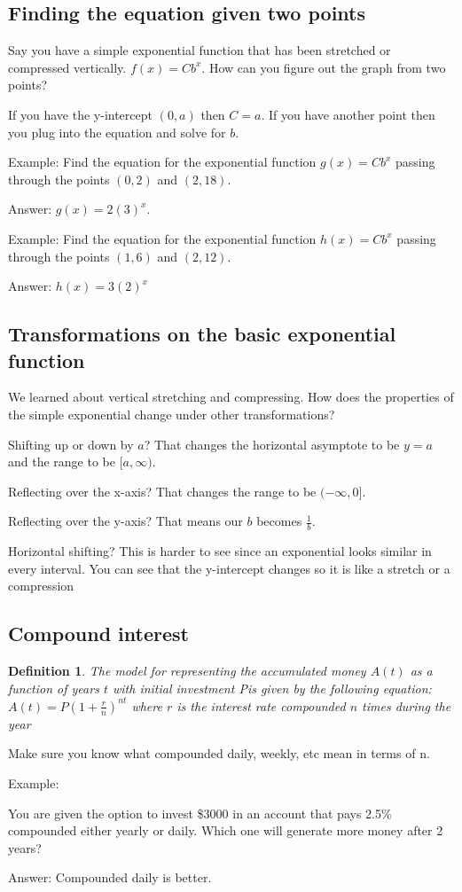 \documentclass{tufte-handout}
\newtheorem{mydef}{Definition}
\begin{document}
\subsection{Finding the equation given two points}
Say you have a simple exponential function that has been stretched or compressed vertically.  $f(x) = C b^x$.  How can you figure out the graph from two points?

If you have the y-intercept $(0,a)$ then $C=a$.  If you have another point then you plug into the equation and solve for $b$.

Example: Find the equation for the exponential function $g(x) = C b^x$ passing through the points $(0,2)$ and $(2,18)$.

Answer: $g(x) = 2 (3)^x$.

Example: Find the equation for the exponential function $h(x) = C b^x$ passing through the points $(1,6)$ and $(2,12)$.

Answer: $h(x) = 3 (2)^x$

\subsection{Transformations on the basic exponential function}

We learned about vertical stretching and compressing.  How does the properties of the simple exponential change under other transformations?

Shifting up or down by $a$? That changes the horizontal asymptote to be $y=a$ and the range to be $[a,\infty)$.

Reflecting over the x-axis? That changes the range to be $(-\infty,0]$.

Reflecting over the y-axis? That means our $b$ becomes $\frac{1}{b}$.

Horizontal shifting? This is harder to see since an exponential looks similar in every interval.  You can see that the y-intercept changes so it is like a stretch or a compression

\subsection{Compound interest}

\begin{mydef}
The model for representing the accumulated money $A(t)$ as a function of years $t$ with initial investment Pis given by the following equation: $A(t) = P(1 + \frac{r}{n})^{nt}$ where $r$ is the interest rate compounded $n$ times during the year
\end{mydef}

Make sure you know what compounded daily, weekly, etc mean in terms of n.

Example:

You are given the option to invest \$3000 in an account that pays 2.5\% compounded either yearly or daily.  Which one will generate more money after 2 years?

Answer: Compounded daily is better.
\end{document}
